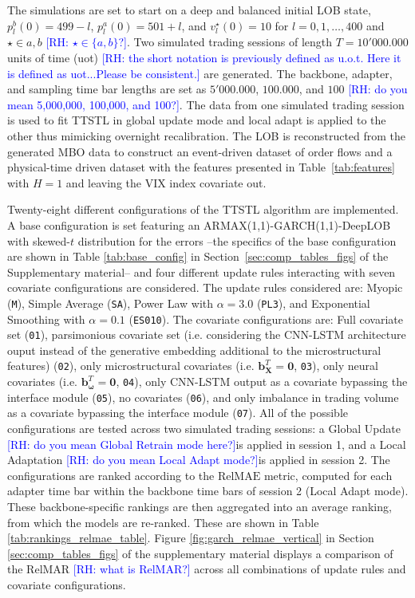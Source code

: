 \documentclass[10pt,a4paper,oneside]{article}
\newcommand{\rh}[1]{\textcolor{blue}{\textsf{[RH: #1]}}}
\begin{document}
The simulations are set to start on a deep and balanced initial LOB state, $p^b_l(0) = 499 - l$, $p^a_l(0) = 501 + l$, and $v^\star_l(0) = 10$ for $l = 0, 1, \dots, 400$ and $\star \in {a, b}$ \rh{$\star \in \{a, b\}$?}. Two simulated trading sessions of length $T = 10'000.000$ units of time (uot) \rh{the short notation is previously defined as u.o.t. Here it is defined as uot...Please be consistent.} are generated. The backbone, adapter, and sampling time bar lengths are set as $5'000.000$, $100.000$, and $100$ \rh{do you mean 5,000,000, 100,000, and 100?}. The data from one simulated trading session is used to fit TTSTL in global update mode and local adapt is applied to the other thus mimicking overnight recalibration. The LOB is reconstructed from the generated MBO data to construct an event-driven dataset of order flows and a physical-time driven dataset with the features presented in Table~\ref{tab:features} with $H = 1$ and leaving the VIX index covariate out.

Twenty-eight different configurations of the TTSTL algorithm are implemented. A base configuration is set featuring an ARMAX(1,1)-GARCH(1,1)-DeepLOB with skewed-$t$ distribution for the errors --the specifics of the base configuration are shown in Table \ref{tab:base_config} in Section~\ref{sec:comp_tables_figs} of the Supplementary material-- and four different update rules interacting with seven covariate configurations are considered. The update rules considered are: Myopic (\verb|M|), Simple Average (\verb|SA|), Power Law with $\alpha = 3.0$ (\verb|PL3|), and Exponential Smoothing with $\alpha = 0.1$ (\verb|ES010|). The covariate configurations are: Full covariate set (\verb|01|), parsimonious covariate set (i.e. considering the CNN-LSTM architecture ouput instead of the generative embedding additional to the microstructural features) (\verb|02|), only microstructural covariates (i.e. $\mathbf{b}^T_{\mathbf{X}} = \mathbf{0}$, \verb|03|), only neural covariates (i.e. $\mathbf{b}^T_{\boldsymbol{\omega}} = \mathbf{0}$, \verb|04|), only CNN-LSTM output as a covariate bypassing the interface module (\verb|05|), no covariates (\verb|06|), and only imbalance in trading volume as a covariate bypassing the interface module (\verb|07|). All of the possible configurations are tested across two simulated trading sessions: a Global Update \rh{do you mean Global Retrain mode here?}is applied in session 1, and a Local Adaptation \rh{do you mean Local Adapt mode?}is applied in session 2. The configurations are ranked according to the $\mathrm{RelMAE}$ metric, computed for each adapter time bar within the backbone time bars of session 2 (Local Adapt mode). These backbone-specific rankings are then aggregated into an average ranking, from which the models are re-ranked. These are shown in Table \ref{tab:rankings_relmae_table}. Figure \ref{fig:garch_relmae_vertical} in Section \ref{sec:comp_tables_figs} of the supplementary material displays a comparison of the RelMAR \rh{what is RelMAR?} across all combinations of update rules and covariate configurations.
\end{document}
